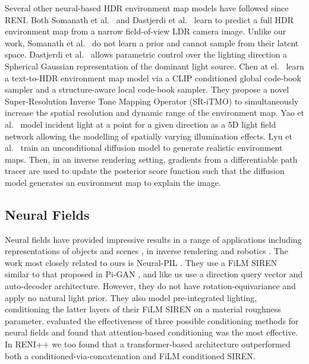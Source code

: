 Several other neural-based HDR environment map models have followed since RENI. Both Somanath et al.~\cite{Somanath_2021_CVPR} and Dastjerdi et al.~\cite{dastjerdiEverLightIndoorOutdoorEditable2023} learn to predict a full HDR environment map from a narrow field-of-view LDR camera image. Unlike our work, Somanath et al.~\cite{Somanath_2021_CVPR} do not learn a prior and cannot sample from their latent space. Dastjerdi et al.~\cite{dastjerdiEverLightIndoorOutdoorEditable2023} allows parametric control over the lighting direction a Spherical Gaussian representation of the dominant light source. Chen at el.~\cite{chenText2LightZeroShotTextDriven2022} learn a text-to-HDR environment map model via a CLIP \cite{radfordLearningTransferableVisual2021} conditioned global code-book sampler and a structure-aware local code-book sampler. They propose a novel Super-Resolution Inverse Tone Mapping Operator (SR-iTMO) to simultaneously increase the spatial resolution
and dynamic range of the environment map. Yao et al.~\cite{yaoNeILFNeuralIncident2022} model incident light at a point for a given direction as a 5D light field network allowing the modelling of spatially varying illumination effects. Lyu et al.~\cite{lyuDiffusionPosteriorIllumination2023a} train an unconditional diffusion model \cite{hoDenoisingDiffusionProbabilistic2020} to generate realistic environment maps. Then, in an inverse rendering setting, gradients from a differentiable path tracer are used to update the posterior score function such that the diffusion model generates an environment map to explain the image.

\subsection{Neural Fields}

Neural fields \cite{xie_neural_2021} have provided impressive results in a range of applications including representations of objects and scenes \cite{sitzmann_implicit_2020, atzmon_sal_2020, mescheder_occupancy_2019, chibane_neural_2020, chen_learning_2019, gropp_implicit_2020, park_deepsdf_2019, tancik_block-nerf_2022}, in inverse rendering \cite{boss_nerd_2021, bi_neural_2020, rudnev_nerf_2022, srinivasan_nerv_2020, boss_neural-pil_2021, zhang_physg_2021} and robotics \cite{li_3d_2021, chen_full-body_2021, ortiz_isdf_2022}. The work most closely related to ours is Neural-PIL \cite{boss_neural-pil_2021}. They use a FiLM SIREN similar to that proposed in Pi-GAN \cite{chan_pi-gan_2021}, and like us use a direction query vector and auto-decoder architecture. However, they do not have rotation-equivariance and apply no natural light prior. They also model pre-integrated lighting, conditioning the latter layers of their FiLM SIREN on a material roughness parameter. \cite{rebainAttentionBeatsConcatenation2023} evaluated the effectiveness of three possible conditioning methods for neural fields and found that attention-based conditioning was the most effective. In RENI++ we too found that a transformer-based architecture outperformed both a conditioned-via-concatenation and FiLM conditioned SIREN.

